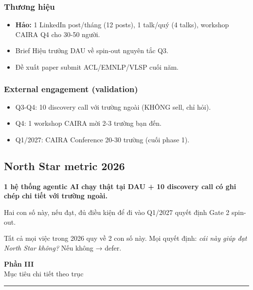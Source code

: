 \documentclass[11pt,a4paper]{article}
\begin{document}
\subsubsection*{Thương hiệu}

\begin{itemize}
\item \textbf{Hảo:} 1 LinkedIn post/tháng (12 posts), 1 talk/quý (4 talks), workshop CAIRA Q4 cho 30-50 người.
\item Brief Hiệu trưởng DAU về spin-out nguyên tắc Q3.
\item Đề xuất paper submit ACL/EMNLP/VLSP cuối năm.
\end{itemize}

\subsubsection*{External engagement (validation)}

\begin{itemize}
\item Q3-Q4: 10 discovery call với trường ngoài (KHÔNG sell, chỉ hỏi).
\item Q4: 1 workshop CAIRA mời 2-3 trường bạn đến.
\item Q1/2027: CAIRA Conference 20-30 trường (cuối phase 1).
\end{itemize}

\subsection{North Star metric 2026}

\begin{keybox}[title=North Star 2026]
\textbf{1 hệ thống agentic AI chạy thật tại DAU + 10 discovery call có ghi
chép chi tiết với trường ngoài.}

Hai con số này, nếu đạt, đủ điều kiện để đi vào Q1/2027 quyết định Gate 2 spin-out.
\end{keybox}

Tất cả mọi việc trong 2026 quy về 2 con số này. Mọi quyết định: \textit{cái này
giúp đạt North Star không?} Nếu không → defer.

\clearpage

\begin{center}
\vspace*{0.5em}
{\sffamily\bfseries\Huge\color{ambition} Phần III}\\[0.5em]
{\sffamily\LARGE\color{mid} Mục tiêu chi tiết theo trục}\\[0.5em]
{\color{ambition}\rule{6cm}{0.4pt}}
\end{center}
\vspace{1em}
\end{document}
